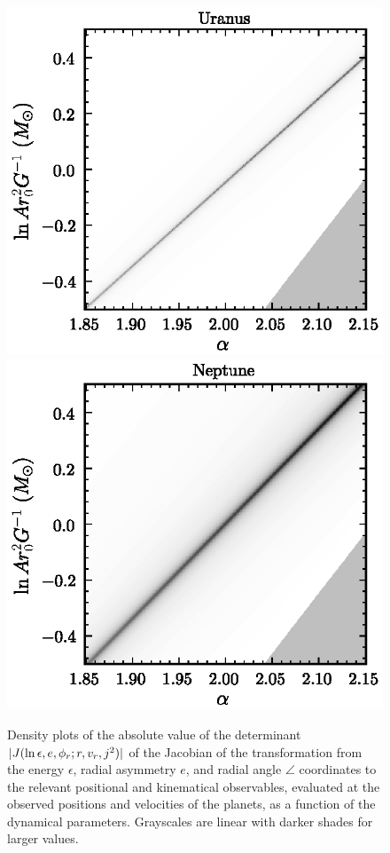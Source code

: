 \begin{figure}
\includegraphics[height=.2\textheight]{figs_solarsystem/jacobian_Uranus.ps}
\includegraphics[height=.2\textheight]{figs_solarsystem/jacobian_Neptune.ps}
\caption[Density plots of the absolute value of the determinant of the
  Jacobian of the transformation from the energy, radial asymmetry,
  and radial angle coordinates to the relevant positional and
  kinematical observables]{Density plots of the absolute value of the
  determinant $|J(\ln{\epsilon},e,\phi_r;r,v_r,j^2)|$ of the Jacobian
  of the transformation from the energy $\epsilon$, radial asymmetry
  $e$, and radial angle $\angle$ coordinates to the relevant
  positional and kinematical observables, evaluated at the observed
  positions and velocities of the planets, as a function of the
  dynamical parameters. Grayscales are linear with darker shades for
  larger values.}\label{fig:jacobiansPlanets}
\end{figure}


